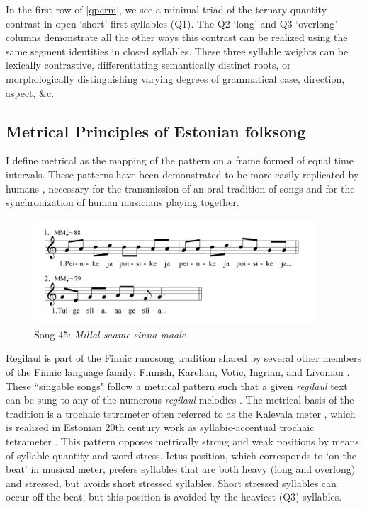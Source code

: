 In the first row of \ref{qperm}, we see a minimal triad of the ternary quantity contrast in open `short' first syllables (Q1). The Q2 `long' and Q3 `overlong' columns demonstrate all the other ways this contrast can be realized using the same segment identities in closed syllables. These three syllable weights can be lexically contrastive, differentiating semantically distinct roots, or morphologically distinguishing varying degrees of grammatical case, direction, aspect, \&c. 



\subsection{Metrical Principles of Estonian folksong}

 I define metrical as the mapping of the pattern on a frame formed of equal time intervals. These patterns have been demonstrated to be more easily replicated by humans \citep{essensPovel1985}, necessary for the transmission of an oral tradition of songs and for the synchronization of human musicians playing together. 

\begin{figure}[ht]
\begin{center}
\includegraphics[width=300pt]{figures/045.png}
\caption{Song 45: {\it Millal saame sinna maale}}
\label{045}
\end{center}
\end{figure}

Regilaul is part of the Finnic runosong tradition shared by several other members of the Finnic language family: Finnish, Karelian, Votic, Ingrian, and Livonian \citep{rossLehiste2001}. These ``singable songs" \citep{tormis1985} follow a metrical pattern such that a given {\it regilaul} text can be sung to any of the numerous {\it regilaul} melodies \citep{rossLehiste2001}. The metrical basis of the tradition is a trochaic tetrameter often referred to as the Kalevala meter \citep{oras2019}, which is realized in Estonian 20th century work as syllabic-accentual trochaic tetrameter \citep{lotmanLotman2013}. This pattern opposes metrically strong and weak positions by means of syllable quantity and word stress. Ictus position, which corresponds to `on the beat' in musical meter, prefers syllables that are both heavy (long and overlong) and stressed, but avoids short stressed syllables. Short stressed syllables can occur off the beat, but this position is avoided by the heaviest (Q3) syllables. 

